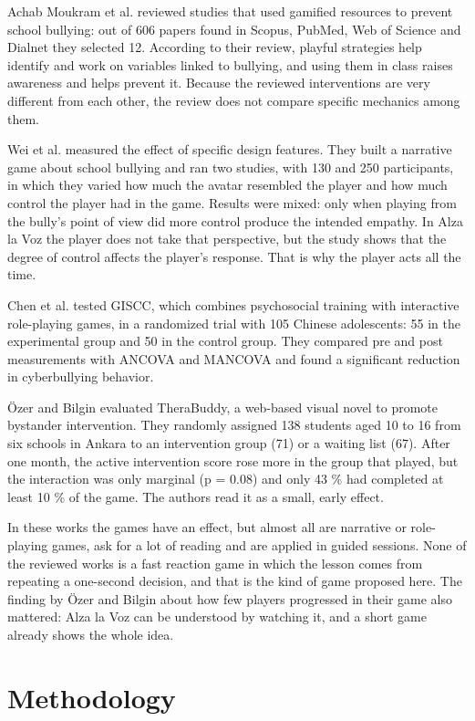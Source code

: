 \documentclass[conference]{IEEEtran}
\begin{document}
Achab Moukram et al. \cite{ref6} reviewed studies that used gamified resources to prevent school bullying: out of 606 papers found in Scopus, PubMed, Web of Science and Dialnet they selected 12. According to their review, playful strategies help identify and work on variables linked to bullying, and using them in class raises awareness and helps prevent it. Because the reviewed interventions are very different from each other, the review does not compare specific mechanics among them.

Wei et al. \cite{ref7} measured the effect of specific design features. They built a narrative game about school bullying and ran two studies, with 130 and 250 participants, in which they varied how much the avatar resembled the player and how much control the player had in the game. Results were mixed: only when playing from the bully's point of view did more control produce the intended empathy. In Alza la Voz the player does not take that perspective, but the study shows that the degree of control affects the player's response. That is why the player acts all the time.

Chen et al. \cite{ref8} tested GISCC, which combines psychosocial training with interactive role-playing games, in a randomized trial with 105 Chinese adolescents: 55 in the experimental group and 50 in the control group. They compared pre and post measurements with ANCOVA and MANCOVA and found a significant reduction in cyberbullying behavior.

Özer and Bilgin \cite{ref9} evaluated TheraBuddy, a web-based visual novel to promote bystander intervention. They randomly assigned 138 students aged 10 to 16 from six schools in Ankara to an intervention group (71) or a waiting list (67). After one month, the active intervention score rose more in the group that played, but the interaction was only marginal (p = 0.08) and only 43 \% had completed at least 10 \% of the game. The authors read it as a small, early effect.

In these works the games have an effect, but almost all are narrative or role-playing games, ask for a lot of reading and are applied in guided sessions. None of the reviewed works is a fast reaction game in which the lesson comes from repeating a one-second decision, and that is the kind of game proposed here. The finding by Özer and Bilgin about how few players progressed in their game also mattered: Alza la Voz can be understood by watching it, and a short game already shows the whole idea.

\section{Methodology}
\end{document}
